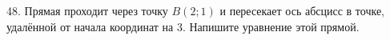 48. Прямая проходит через точку $B(2;1)$ и пересекает ось абсцисс в точке, удалённой от начала координат на 3. Напишите уравнение этой прямой.\\
